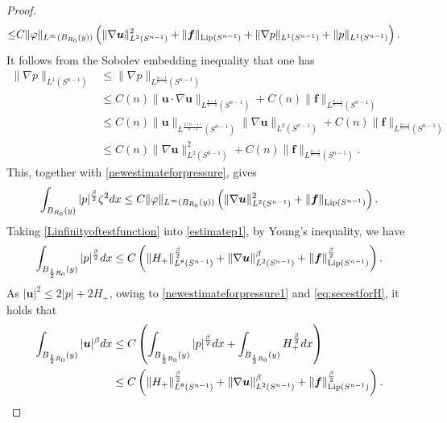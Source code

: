 \documentclass[12pt]{amsart}
\newcommand{\Bu}{{\boldsymbol{u}}}
\newcommand{\Bf}{{\boldsymbol{f}}}
\begin{document}
{\begin{proof}
\begin{equation}
\begin{aligned}
				\le& C\|\varphi\|_{L^{\infty}(B_{R_0}(y))}\left(\|\nabla \Bu\|_{L^{2}(S^{n-1} ) }^{2}+\|\Bf\|_{\textnormal{Lip}(S^{n-1}) } + \|\nabla p\|_{L^1(S^{n-1})} + \|p\|_{L^1(S^{n-1})} \right). 
			\end{aligned}
		\end{equation}		
		It follows from  the Sobolev embedding inequality that one has 
		\begin{equation}\label{gradientofp}
			\begin{aligned}
				\|\nabla p\|_{L^{1}(S^{n-1})} 	&\leq 	\|\nabla p\|_{L^{\frac{n-1}{n-2}}(S^{n-1})}\\ 
				&\leq C(n) \|\Bu\cdot \nabla \Bu\|_{L^{\frac{n-1}{n-2}}(S^{n-1})} + C(n) \| \Bf\|_{L^{\frac{n-1}{n-2}}(S^{n-1})}\\
				&\leq C(n)\|\Bu\|_{L^{\frac{2(n-1)}{n-3}}(S^{n-1})}\| \nabla \Bu\|_{L^{2}(S^{n-1})} + C(n) \| \Bf\|_{L^{\frac{n-1}{n-2}}(S^{n-1})} \\
				&\leq C(n)\| \nabla \Bu\|_{L^{2}(S^{n-1})}^2+ C(n) \| \Bf\|_{L^{\frac{n-1}{n-2}}(S^{n-1})}.
			\end{aligned}
		\end{equation}
		This, together with \eqref{newestimateforpressure}, gives
		\begin{equation}\label{estimatep1}
			\int_{B_{R_0}(y)}|p|^{\frac{\beta}{2}}\zeta^{2} dx
			\le C \|\varphi\|_{L^{\infty}(B_{R_0}(y))}\left(\|\nabla \Bu\|_{L^{2}(S^{n-1} ) }^{2}+\|\Bf\|_{\textnormal{Lip}(S^{n-1})} \right).
		\end{equation}	
		Taking \eqref{Linfinityoftestfunction} into \eqref{estimatep1}, by Young's inequality, we have 
		\begin{equation}\label{newestimateforpressure1}
			\int_{B_{\frac12 R_0}(y)} |p|^{\frac{\beta}{2}} dx \leq C \left(\|H_{+}\|_{L^\theta(S^{n-1})}^{\frac{\beta}{2}} + \|\nabla \Bu\|_{L^2(S^{n-1})}^{\beta} + \|\Bf\|_{\textnormal{Lip}(S^{n-1})}^{\frac{\beta}{2}} \right). 
		\end{equation}	
		As  $|\Bu|^{2}\le 2|p|+2H_{+}$, owing to \eqref{newestimateforpressure1} and \eqref{eq:secestforH}, it holds that 
		\begin{equation}\label{eq:kkey2}
			\begin{aligned}
				\int_{B_{\frac12 R_0}(y)}|\Bu|^{\beta} dx &\leq C\left(\int_{B_{\frac12 R_0}(y)}|p|^{\frac{\beta}{2}} dx +\int_{B_{\frac12 R_0}(y)}H_{+}^{\frac{\beta}{2}} dx \right) \\
				&\leq C \left( \|H_{+}\|_{L^{\theta}(S^{n-1})}^\frac{\beta}{2} + 
				\|\nabla \Bu\|_{L^2(S^{n-1})}^{\beta} + \|\Bf\|_{\textnormal{Lip}(S^{n-1})}^{\frac{\beta}{2}}\right).
			\end{aligned}          
		\end{equation}
		

\end{proof}}
\end{document}
